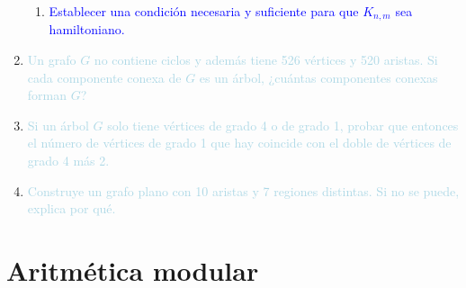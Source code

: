 \documentclass{article}
\newcommand{\lb}[1]{\textcolor{lightblue}{#1}}
\newcommand{\db}[1]{\textcolor{blue}{#1}}
\begin{document}
\begin{enumerate}[label=\color{red}\textbf{\arabic*)},leftmargin=*]
\begin{enumerate}[label=\color{red}\alph*)]
		\item \db{Establecer una condición necesaria y suficiente para que $K_{n,m}$ sea hamiltoniano.}
	\end{enumerate}
	\item \lb{Un grafo $G$ no contiene ciclos y además tiene 526 vértices y 520 aristas. Si cada componente conexa de $G$ es un árbol, ¿cuántas componentes conexas forman $G$?}
	\item \lb{Si un árbol $G$ solo tiene vértices de grado 4 o de grado 1, probar que entonces el número de vértices de grado 1 que hay coincide con el doble de vértices de grado 4 más 2.}
	\item \lb{Construye un grafo plano con 10 aristas y 7 regiones distintas. Si no se puede, explica por qué.}
\end{enumerate}
\newpage
\section{Aritmética modular}
\end{document}
